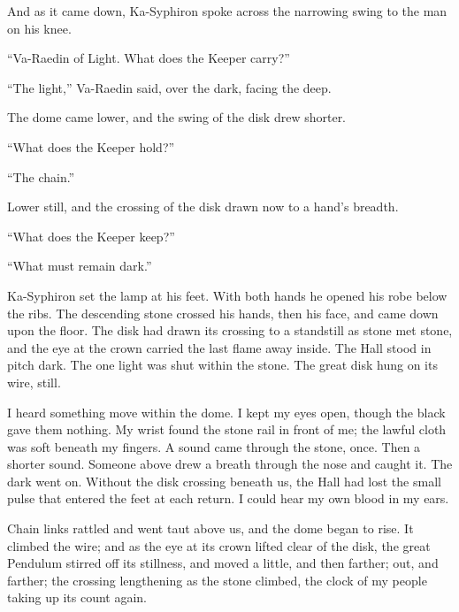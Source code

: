And as it came down, Ka-Syphiron spoke across the narrowing swing to the man on his knee.\par

``Va-Raedin of Light. What does the Keeper carry?''\par

``The light,'' Va-Raedin said, over the dark, facing the deep.\par

The dome came lower, and the swing of the disk drew shorter.\par

``What does the Keeper hold?''\par

``The chain.''\par

Lower still, and the crossing of the disk drawn now to a hand's breadth.\par

``What does the Keeper keep?''\par

``What must remain dark.''\par

Ka-Syphiron set the lamp at his feet. With both hands he opened his robe below the ribs. The descending stone crossed his hands, then his face, and came down upon the floor. The disk had drawn its crossing to a standstill as stone met stone, and the eye at the crown carried the last flame away inside. The Hall stood in pitch dark. The one light was shut within the stone. The great disk hung on its wire, still.\par

I heard something move within the dome. I kept my eyes open, though the black gave them nothing. My wrist found the stone rail in front of me; the lawful cloth was soft beneath my fingers. A sound came through the stone, once. Then a shorter sound. Someone above drew a breath through the nose and caught it. The dark went on. Without the disk crossing beneath us, the Hall had lost the small pulse that entered the feet at each return. I could hear my own blood in my ears.\par

\ornament

Chain links rattled and went taut above us, and the dome began to rise. It climbed the wire; and as the eye at its crown lifted clear of the disk, the great Pendulum stirred off its stillness, and moved a little, and then farther; out, and farther; the crossing lengthening as the stone climbed, the clock of my people taking up its count again.\par

